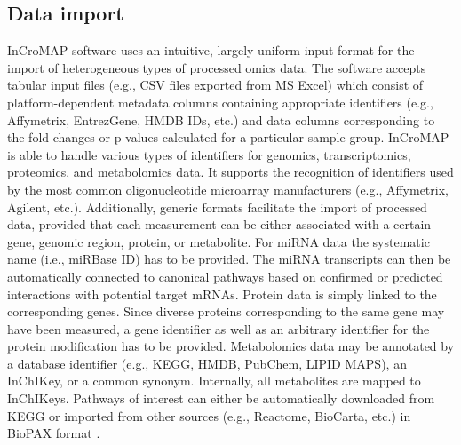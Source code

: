 \documentclass[final,5p,times,twocolumn]{elsarticle}
\newcommand\red[1]{{\color{red}#1}}
\begin{document}
\subsection{Data import}
\red{InCroMAP software uses an intuitive, largely uniform input format for the import of heterogeneous types of processed omics data. The software accepts tabular input files (e.g., CSV files exported from MS Excel) which consist of platform-dependent metadata columns containing appropriate identifiers (e.g., Affymetrix, EntrezGene, HMDB IDs, etc.) and data columns corresponding to the fold-changes or p-values calculated for a particular sample group.}
InCroMAP is able to handle various types of identifiers for genomics, transcriptomics, proteomics, and metabolomics data. It supports the recognition of identifiers used by the most common oligonucleotide microarray manufacturers (e.g., Affymetrix, Agilent, etc.). Additionally, generic formats facilitate the import of processed data, provided that each measurement can be either associated with a certain gene, genomic region, protein, or metabolite. \red{For miRNA data the systematic name (i.e., miRBase ID) has to be provided. The miRNA transcripts can then be automatically connected to canonical pathways based on confirmed or predicted interactions with potential target mRNAs. Protein data is simply linked to the corresponding genes. Since diverse proteins corresponding to the same gene may have been measured, a gene identifier as well as an arbitrary identifier for the protein modification has to be provided.} Metabolomics data may be annotated by a database identifier (e.g., KEGG, HMDB, PubChem, LIPID MAPS), an InChIKey, or a common synonym. Internally, all metabolites are mapped to InChIKeys. Pathways of interest can either be automatically downloaded from KEGG or imported from other sources (e.g., Reactome, BioCarta, etc.) in BioPAX format \cite{Eustachio2011}.
\end{document}
